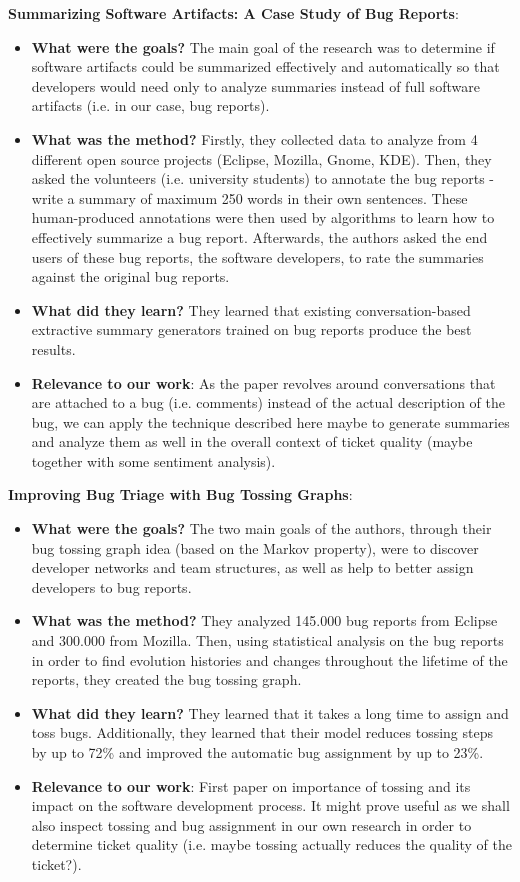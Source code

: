 \documentclass{mprop}
\begin{document}
\textbf{Summarizing Software Artifacts: A Case Study of Bug Reports}\cite{rastkar2010summarizing}:
\begin{itemize}
  \item \textbf{What were the goals?}
  The main goal of the research was to determine if software artifacts could be summarized effectively and automatically so that developers would need only to analyze summaries instead of full software artifacts (i.e. in our case, bug reports). 
  \item \textbf{What was the method?}
  Firstly, they collected data to analyze from 4 different open source projects (Eclipse, Mozilla, Gnome, KDE). Then, they asked the volunteers (i.e. university students) to annotate the bug reports - write a summary of maximum 250 words in their own sentences. These human-produced annotations were then used by algorithms to learn how to effectively summarize a bug report.  Afterwards, the authors asked the end users of these bug reports, the software developers, to rate the summaries against the original bug reports. 
  \item \textbf{What did they learn?}
  They learned that existing conversation-based extractive summary generators trained on bug reports produce the best results. 
  \item \textbf{Relevance to our work}:
  As the paper revolves around conversations that are attached to a bug (i.e. comments) instead of the actual description of the bug, we can apply the technique described here maybe to generate summaries and analyze them as well in the overall context of ticket quality (maybe together with some sentiment analysis). 
\end{itemize}

\textbf{Improving Bug Triage with Bug Tossing Graphs}\cite{jeong2009improving}:
\begin{itemize}
  \item \textbf{What were the goals?}
  The two main goals of the authors, through their bug tossing graph idea (based on the Markov property), were to discover developer networks and team structures, as well as help to better assign developers to bug reports. 
  \item \textbf{What was the method?}
  They analyzed 145.000 bug reports from Eclipse and 300.000 from Mozilla. Then, using statistical analysis on the bug reports in order to find evolution histories and changes throughout the lifetime of the reports, they created the bug tossing graph. 
  \item \textbf{What did they learn?}
  They learned that it takes a long time to assign and toss bugs. Additionally, they learned that their model reduces tossing steps by up to 72\% and improved the automatic bug assignment by up to 23\%. 
  \item \textbf{Relevance to our work}:
  First paper on importance of tossing and its impact on the software development process. It might prove useful as we shall also inspect tossing and bug assignment in our own research in order to determine ticket quality (i.e. maybe tossing actually reduces the quality of the ticket?). 
\end{itemize}
\end{document}
